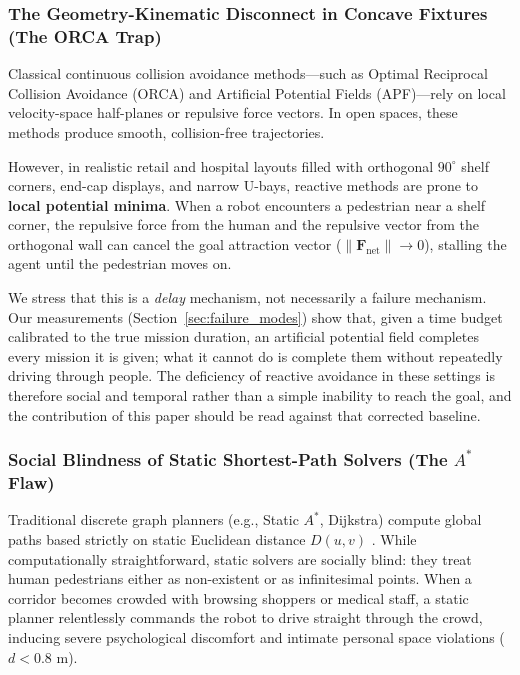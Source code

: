 \documentclass[journal]{IEEEtran}
\begin{document}
\subsubsection{The Geometry-Kinematic Disconnect in Concave Fixtures (The ORCA Trap)}
\label{sec:orca_trap}
Classical continuous collision avoidance methods—such as Optimal Reciprocal Collision Avoidance (ORCA) \cite{vandenberg2008orca} and Artificial Potential Fields (APF)—rely on local velocity-space half-planes or repulsive force vectors. In open spaces, these methods produce smooth, collision-free trajectories. 

However, in realistic retail and hospital layouts filled with orthogonal $90^\circ$ shelf corners, end-cap displays, and narrow U-bays, reactive methods are prone to \textbf{local potential minima}. When a robot encounters a pedestrian near a shelf corner, the repulsive force from the human and the repulsive vector from the orthogonal wall can cancel the goal attraction vector ($\|\mathbf{F}_{\text{net}}\| \to 0$), stalling the agent until the pedestrian moves on.

We stress that this is a \emph{delay} mechanism, not necessarily a failure mechanism. Our measurements (Section~\ref{sec:failure_modes}) show that, given a time budget calibrated to the true mission duration, an artificial potential field completes every mission it is given; what it cannot do is complete them without repeatedly driving through people. The deficiency of reactive avoidance in these settings is therefore social and temporal rather than a simple inability to reach the goal, and the contribution of this paper should be read against that corrected baseline.

\subsubsection{Social Blindness of Static Shortest-Path Solvers (The \texorpdfstring{$A^*$}{A*} Flaw)}
Traditional discrete graph planners (e.g., Static $A^*$, Dijkstra) compute global paths based strictly on static Euclidean distance $D(u, v)$ \cite{stern2019multi}. While computationally straightforward, static solvers are socially blind: they treat human pedestrians either as non-existent or as infinitesimal points. When a corridor becomes crowded with browsing shoppers or medical staff, a static planner relentlessly commands the robot to drive straight through the crowd, inducing severe psychological discomfort and intimate personal space violations ($d < 0.8\text{ m}$).
\end{document}
